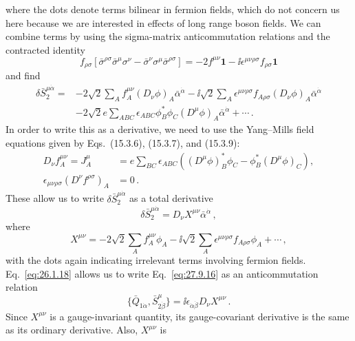 where the dots denote terms bilinear in fermion fields, which do not concern
us here because we are interested in effects of long range boson fields. We
can combine terms by using the sigma-matrix anticommutation relations and
the contracted identity
\[
  f_{\rho\sigma}\left[
    \bar\sigma^{\rho\sigma}\bar\sigma^\mu\sigma^\nu
    -\bar\sigma^\nu\sigma^\mu\bar\sigma^{\rho\sigma}
  \right]
  =-2f^{\mu\nu}\mathbf{1}
    -\ii\epsilon^{\mu\nu\rho\sigma}f_{\rho\sigma}\mathbf{1}
\]
and find
\[
  \begin{aligned}
  \delta\bar S_2^{\mu\dot\alpha}={}&
  -2\sqrt{2}\sum_Af_A^{\mu\nu}(D_\nu\phi)_A
    \bar\alpha^{\dot\alpha}
  -\ii\sqrt{2}\sum_A\epsilon^{\mu\nu\rho\sigma}
    f_{A\rho\sigma}(D_\nu\phi)_A\bar\alpha^{\dot\alpha}
  \\
  &-2\sqrt{2}e\sum_{ABC}\epsilon_{ABC}\phi_B^*\phi_C
    (D^\mu\phi)_A\bar\alpha^{\dot\alpha}+\cdots\,.
  \end{aligned}
\]
In order to write this as a derivative, we need to use the Yang--Mills field
equations given by Eqs.~(15.3.6), (15.3.7), and (15.3.9):
\[
  \begin{aligned}
  D_\nu f_A^{\mu\nu}
  =J_A^\mu
  &=e\sum_{BC}\epsilon_{ABC}
    \left((D^\mu\phi)_B^*\phi_C-\phi_B^*(D^\mu\phi)_C\right),
  \\
  \epsilon_{\mu\nu\rho\sigma}(D^\nu f^{\rho\sigma})_A&=0\,.
  \end{aligned}
\]
These allow us to write \(\delta\bar S_2^{\mu\dot\alpha}\) as a total
derivative
\begin{equation}
  \delta\bar S_2^{\mu\dot\alpha}
  =D_\nu X^{\mu\nu}\bar\alpha^{\dot\alpha}\,,
  \tag{27.9.16}\label{eq:27.9.16}
\end{equation}
where
\begin{equation}
  X^{\mu\nu}
  =-2\sqrt{2}\sum_Af_A^{\mu\nu}\phi_A
  -\ii\sqrt{2}\sum_A\epsilon^{\mu\nu\rho\sigma}
    f_{A\rho\sigma}\phi_A+\cdots\,,
  \tag{27.9.17}\label{eq:27.9.17}
\end{equation}
with the dots again indicating irrelevant terms involving fermion fields.
Eq.~\eqref{eq:26.1.18} allows us to write Eq.~\eqref{eq:27.9.16} as an
anticommutation relation
\begin{equation}
  \{\bar Q_{1\dot\alpha},\bar S_{2\dot\beta}^\mu\}
  =\ii\epsilon_{\dot\alpha\dot\beta}D_\nu X^{\mu\nu}\,.
  \tag{27.9.18}\label{eq:27.9.18}
\end{equation}
Since \(X^{\mu\nu}\) is a gauge-invariant quantity, its gauge-covariant
derivative is the same as its ordinary derivative. Also, \(X^{\mu\nu}\) is
